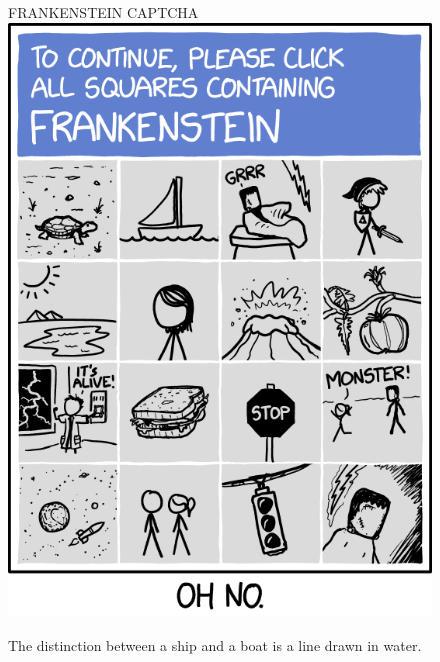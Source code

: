 \begin{figure}[H]
\centering
\uppercase{Frankenstein Captcha} \\
\includegraphics[scale=0.75]{frankenstein_captcha_2x}
\caption*{The distinction between a ship and a boat is a line drawn in water.\footnotemark}
\end{figure}

